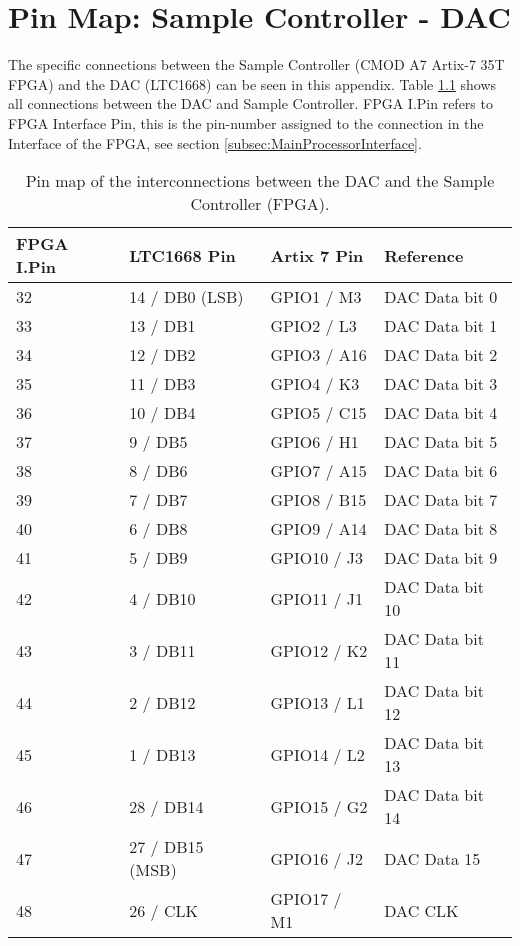 \chapter{Pin Map: Sample Controller - DAC} \label{App:PinMap_FPGA_DAC}
The specific connections between the Sample Controller (CMOD A7 Artix-7 35T FPGA) and the DAC (LTC1668) can be seen in this appendix. Table \ref{tab:App_FPGA_DAC_PinMap} shows all connections between the DAC and Sample Controller. FPGA I.Pin refers to FPGA Interface Pin, this is the
pin-number assigned to the connection in the Interface of the FPGA, see section \ref{subsec:MainProcessorInterface}. 

\begin{table}[H]
    \begin{tabular}{|m{5.2em}|m{8em}|m{8em}|m{8em}|}
    \hline
    \textbf{FPGA I.Pin} &   \textbf{LTC1668 Pin} & \textbf{Artix 7 Pin} & \textbf{Reference}  \\ \hline
    32 & 14 / DB0 (LSB) & GPIO1 / M3 & DAC Data bit 0 \\ \hline
    33 & 13 / DB1 & GPIO2 / L3 & DAC Data bit 1 \\ \hline
    34 & 12 / DB2 & GPIO3 / A16 & DAC Data bit 2 \\ \hline
    35 & 11 / DB3 & GPIO4 / K3 & DAC Data bit 3 \\\hline
    36 & 10 / DB4 & GPIO5 / C15 & DAC Data bit 4 \\ \hline
    37 & 9 / DB5 & GPIO6 / H1 & DAC Data bit 5 \\ \hline
    38 & 8 / DB6 & GPIO7 / A15 & DAC Data bit 6 \\ \hline
    39 & 7 / DB7 & GPIO8 / B15 & DAC Data bit 7 \\ \hline
    40 & 6 / DB8 & GPIO9 / A14 & DAC Data bit 8 \\ \hline
    41 & 5 / DB9 & GPIO10 / J3 & DAC Data bit 9 \\ \hline
    42 & 4 / DB10 & GPIO11 / J1 & DAC Data bit 10 \\ \hline
    43 & 3 / DB11 & GPIO12 / K2 & DAC Data bit 11 \\ \hline
    44 & 2 / DB12 & GPIO13 / L1 & DAC Data bit 12 \\ \hline
    45 & 1 / DB13 & GPIO14 / L2 & DAC Data bit 13 \\ \hline
    46 & 28 / DB14 & GPIO15 / G2 & DAC Data bit 14 \\ \hline
    47 & 27 / DB15 (MSB) & GPIO16 / J2 & DAC Data 15 \\ \hline
    48 & 26 / CLK & GPIO17 / M1 & DAC CLK \\ \hline
 
    \end{tabular}
    \caption{Pin map of the interconnections between the DAC and the Sample Controller (FPGA).}
    \label{tab:App_FPGA_DAC_PinMap}
  \end{table}
